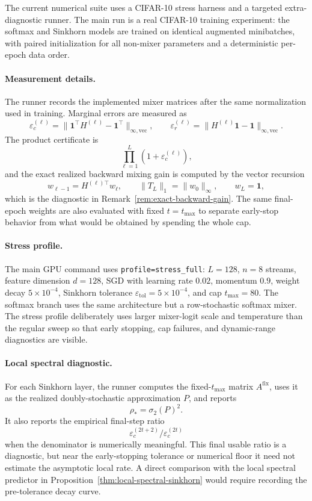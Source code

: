 \documentclass[11pt]{article}
\numberwithin{equation}{section}
\theoremstyle{plain}
\theoremstyle{definition}
\theoremstyle{remark}
\newcommand{\ones}{\mathbf{1}}
\newcommand{\epstol}{\varepsilon_{\mathrm{tol}}}
\begin{document}
The current numerical suite uses a CIFAR-10 stress harness and a targeted
extra-diagnostic runner. The main run is a real CIFAR-10 training experiment:
the softmax and Sinkhorn models are trained on identical augmented minibatches,
with paired initialization for all non-mixer parameters and a deterministic
per-epoch data order.

\paragraph{Measurement details.}
The runner records the implemented mixer matrices after the same normalization used in
training. Marginal errors are measured as
\[
\varepsilon_c^{(\ell)}=\|\ones^\top H^{(\ell)}-\ones^\top\|_{\infty,\mathrm{vec}},
\qquad
\varepsilon_r^{(\ell)}=\|H^{(\ell)}\ones-\ones\|_{\infty,\mathrm{vec}}.
\]
The product certificate is
\[
        \prod_{\ell=1}^L(1+\varepsilon_c^{(\ell)}),
\]
and the exact realized backward mixing gain is computed by the vector recursion
\[
        w_{\ell-1}=H^{(\ell)\top}w_\ell,
        \qquad
        \|T_L\|_1=\|w_0\|_\infty,
        \qquad
        w_L=\ones,
\]
which is the diagnostic in Remark~\ref{rem:exact-backward-gain}. The same final-epoch
weights are also evaluated with fixed \(t=t_{\max}\) to separate early-stop behavior from
what would be obtained by spending the whole cap.

\paragraph{Stress profile.}
The main GPU command uses \texttt{profile=stress\_full}: \(L=128\), \(n=8\) streams,
feature dimension \(d=128\), SGD with learning rate \(0.02\), momentum \(0.9\), weight
decay \(5\times10^{-4}\), Sinkhorn tolerance \(\epstol=5\times10^{-4}\), and cap
\(t_{\max}=80\). The softmax branch uses the same architecture but a row-stochastic
softmax mixer. The stress profile deliberately uses larger mixer-logit scale and temperature
than the regular sweep so that early stopping, cap failures, and dynamic-range diagnostics
are visible.

\paragraph{Local spectral diagnostic.}
For each Sinkhorn layer, the runner computes the fixed-\(t_{\max}\) matrix
\(A^{\mathrm{fix}}\), uses it as the realized doubly-stochastic approximation \(P\), and
reports
\[
        \rho_* = \sigma_2(P)^2.
\]
It also reports the empirical final-step ratio
\[
        \varepsilon_c^{(2t+2)}/\varepsilon_c^{(2t)}
\]
when the denominator is numerically meaningful. This final usable ratio is a diagnostic, but
near the early-stopping tolerance or numerical floor it need not estimate the asymptotic
local rate. A direct comparison with the local spectral predictor in
Proposition~\ref{thm:local-spectral-sinkhorn} would require recording the pre-tolerance decay
curve.
\end{document}
